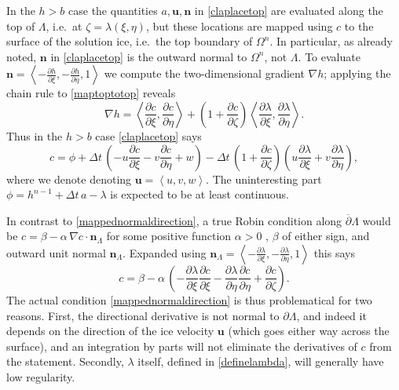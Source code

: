 \documentclass[letterpaper,final,12pt,reqno]{amsart}
\newcommand{\grad}{\nabla}
\newcommand{\bn}{\mathbf{n}}
\newcommand{\bu}{\mathbf{u}}
\begin{document}
In the $h>b$ case the quantities $a,\bu,\bn$ in \eqref{claplacetop} are evaluated along the top of $\Lambda$, i.e.~at $\zeta=\lambda(\xi,\eta)$, but these locations are mapped using $c$ to the surface of the solution ice, i.e.~the top boundary of $\Omega^n$.  In particular, as already noted, $\bn$ in \eqref{claplacetop} is the outward normal to $\Omega^n$, not $\Lambda$.  To evaluate $\bn=\left<-\frac{\partial h}{\partial\xi},-\frac{\partial h}{\partial\eta},1\right>$ we compute the two-dimensional gradient $\grad h$; applying the chain rule to \eqref{maptoptotop} reveals
\begin{equation}
\grad h = \left<\frac{\partial c}{\partial\xi},\frac{\partial c}{\partial\eta}\right> + \left(1+\frac{\partial c}{\partial\zeta}\right) \left<\frac{\partial \lambda}{\partial\xi},\frac{\partial \lambda}{\partial\eta}\right>. \label{hgradient}
\end{equation}
Thus in the $h>b$ case \eqref{claplacetop} says
\begin{equation}
c = \phi + \Delta t\,\left(- u\frac{\partial c}{\partial\xi} - v\frac{\partial c}{\partial\eta} + w\right) - \Delta t\,\left(1+\frac{\partial c}{\partial\zeta}\right)\left(u\frac{\partial \lambda}{\partial\xi} + v\frac{\partial \lambda}{\partial\eta}\right), \label{mappednormaldirection}
\end{equation}
where we denote denoting $\bu=\left<u,v,w\right>$.  The uninteresting part $\phi=h^{n-1} + \Delta t\,a - \lambda$ is expected to be at least continuous.

In contrast to \eqref{mappednormaldirection}, a true Robin condition along $\overline{\partial} \Lambda$ would be $c=\beta-\alpha\,\grad c \cdot \bn_{\Lambda}$ for some positive function $\alpha>0$ \cite[p.~154]{Ockendonetal2003}, $\beta$ of either sign, and outward unit normal $\bn_{\Lambda}$.  Expanded using $\bn_{\Lambda} = \left<-\frac{\partial \lambda}{\partial\xi},-\frac{\partial \lambda}{\partial\eta},1\right>$ this says
\begin{equation*}
c=\beta - \alpha\,\left(-\frac{\partial \lambda}{\partial\xi}\frac{\partial c}{\partial\xi} -\frac{\partial \lambda}{\partial\eta}\frac{\partial c}{\partial\eta} + \frac{\partial c}{\partial\zeta}\right).
\end{equation*}
The actual condition \eqref{mappednormaldirection} is thus problematical for two reasons.  First, the directional derivative is not normal to $\partial\Lambda$, and indeed it depends on the direction of the ice velocity $\bu$ (which goes either way across the surface), and an integration by parts will not eliminate the derivatives of $c$ from the statement.  Secondly, $\lambda$ itself, defined in \eqref{definelambda}, will generally have low regularity.
\end{document}
